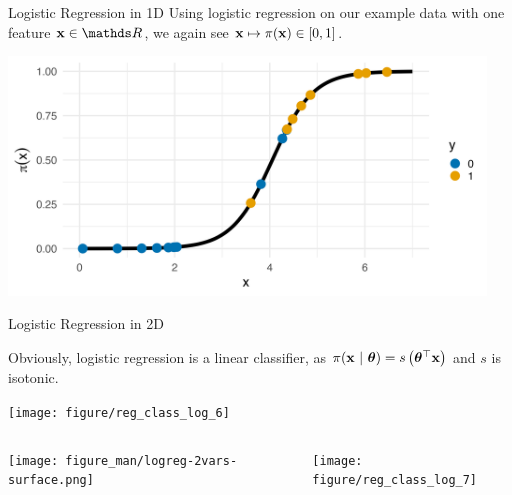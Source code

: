 \documentclass[11pt,compress,t,notes=noshow, xcolor=table]{beamer}
\begin{document}
\begin{vbframe}{Logistic Regression in 1D}
Using logistic regression on our example data with one feature $\xv \in \R$, we again see $\mathbf{x} \mapsto \pi(\mathbf{x}) \in [0,1]$.

\lz

{\centering \includegraphics[width=0.95\textwidth]{figure/preds_with_probs-logistic.png}
}

\end{vbframe}
\begin{vbframe}{Logistic Regression in 2D}

Obviously, logistic regression is a linear classifier, as $\pi(\mathbf{x}~|~ \bm{\theta}) = s\left( \bm{\theta}^\top \mathbf{x} \right)$ 
and $s$ is isotonic.

\lz
\begin{knitrout}\scriptsize
{}\color{fgcolor}

{\centering \texttt{[image: figure/reg\_class\_log\_6]}  

}

\end{knitrout}

\framebreak

\begin{columns}[T]
\begin{column}{0.5\textwidth}
  \texttt{[image: figure\_man/logreg-2vars-surface.png]}
\end{column}
\begin{column}{0.5\textwidth}
\begin{knitrout}\scriptsize
{}\color{fgcolor}

{\centering \texttt{[image: figure/reg\_class\_log\_7]} 

}

\end{knitrout}
\end{column}
\end{columns}

\end{vbframe}

\endlecture
\end{document}
